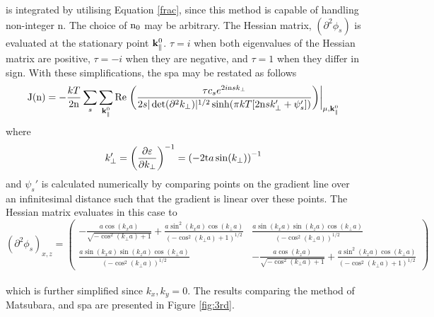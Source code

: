 \documentclass[a4paper, 12pt]{article}
\begin{document}
	is integrated by utilising Equation \eqref{frac}, since this method is capable of handling non-integer n. The choice of $\rm n_0$ may be arbitrary.
	The Hessian matrix, $(\partial^2 \phi_s)$ is evaluated at the stationary point $\rm \bf k_\parallel^{\rm 0}$.
	$\tau=i$ when both eigenvalues of the Hessian matrix are positive, $\tau=-i$ when they are negative, and $\tau=1$ when they differ in sign.
	With these simplifications, the \gls{spa} may be restated as follows
\begin{equation}\label{SPA_2}
	{\rm J(n)} = -\frac{kT}{2{\rm n}}\sum_s \sum_{{\bf k}_\parallel^0}{\rm Re}\left.\left(\frac{\tau c_se^{2i{\rm n}sk_\perp}}{2s\vert \det(\partial^2k_\perp)\vert^{1/2}\sinh(\pi kT[2{\rm n}sk_\perp '+\psi_s '])} \right) \right\vert_{\mu , {\bf k}_\parallel^0}
\end{equation}
where
\begin{equation}
	k_\perp' = \left(\frac{\partial\varepsilon}{\partial k_\perp}\right)^{-1}=\left(-2{\rm t} a\sin(k_\perp)\right)^{-1}
\end{equation}
and $\psi_s'$ is calculated numerically by comparing points on the gradient line over an infinitesimal distance such that the gradient is linear over these points.
The Hessian matrix evaluates in this case to
\\[3mm]
\begin{equation}
	(\partial^2\phi_s)_{x, z}=\begin{pmatrix} -\frac{a\cos(k_x a)}{\sqrt{-\cos^2(k_\perp a)+1}}+\frac{a\sin^2(k_x a)\cos(k_\perp a)}{(-\cos^2(k_\perp a)+1)^{1/2}}&\frac{a\sin(k_x a)\sin(k_z a)\cos(k_\perp a)}{(-\cos^2(k_\perp a))^{1/2}}\\\frac{a\sin(k_x a)\sin(k_z a)\cos(k_\perp a)}{(-\cos^2(k_\perp a))^{1/2}}&-\frac{a\cos(k_z a)}{\sqrt{-\cos^2(k_\perp a)+1}}+\frac{a\sin^2(k_z a)\cos(k_\perp a)}{(-\cos^2(k_\perp a)+1)^{1/2}} \end{pmatrix}
\end{equation}
\normalsize
\\[5mm]
which is further simplified since $k_x, k_y = 0$. The results comparing the method of Matsubara, and \gls{spa} are presented in Figure \ref{fig:3rd}.
\\ [5mm]
\end{document}
